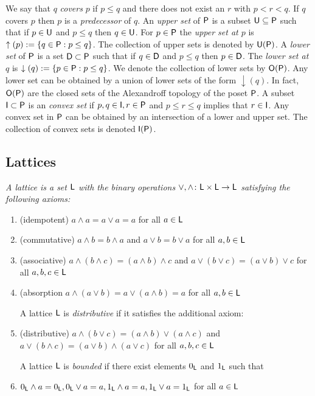 We say that $q$ {\em covers} $p$ if $p\leq q$ and there does not exist an $r$ with $p< r < q$.  
If $q$ covers $p$ then $p$ is a {\em predecessor} of $q$.   An {\em upper set} of ${\mathsf P}$ is a subset ${\mathsf U}\subseteq {\mathsf P}$ such that if $p\in {\mathsf U}$ and $p\leq q$ then $q\in {\mathsf U}$.  For $p\in {\mathsf P}$ the {\em upper set at $p$} is $\uparrow(p):=\{q\in {\mathsf P}:p \leq q\}$.  The collection of upper sets is denoted by ${\mathsf U}({\mathsf P})$.
A {\em lower set} of ${\mathsf P}$ is a set ${\mathsf D}\subset {\mathsf P}$ such that if $q\in {\mathsf D}$ and $p\leq q$ then $p\in {\mathsf D}$.  The {\em lower set at $q$} is $\downarrow(q):=\{p\in {\mathsf P}: p \leq q\}$.  We denote the collection of lower sets by ${\mathsf O}({\mathsf P})$.  Any lower set can be obtained by a union of lower sets of the form $\downarrow(q)$.  In fact, ${\mathsf O}({\mathsf P})$ are the closed sets of the Alexandroff topology of the poset ${\mathsf P}$.  A subset ${\mathsf I}\subset {\mathsf P}$ is an {\em convex set} if $p,q\in {\mathsf I}, r\in {\mathsf P}$ and $ p \leq r \leq q$ implies that $r\in {\mathsf I}$.  Any convex set in ${\mathsf P}$ can be obtained by an intersection of a lower and upper set.  The collection of convex sets is denoted ${\mathsf I}({\mathsf P})$.
 


\subsection{Lattices}

\begin{defn}
{\em
A {\em lattice} is a set ${\mathsf L}$ with the binary operations $\vee,\wedge \colon {\mathsf L}\times {\mathsf L}\to {\mathsf L}$ satisfying the following axioms:

\begin{enumerate}
\item (idempotent) $a\wedge a = a \vee a = a$ for all $a\in {\mathsf L}$
\item (commutative) $a\wedge b = b\wedge a$ and $a\vee b = b \vee a$ for all $a,b\in {\mathsf L}$
\item (associative) $a\wedge (b\wedge c) = (a\wedge b)\wedge c$ and $a\vee(b\vee c) = (a\vee b)\vee c$ for all $a,b,c\in {\mathsf L}$
\item (absorption $a\wedge (a\vee b) = a\vee (a\wedge b)=a$ for all $a,b\in {\mathsf L}$

A lattice ${\mathsf L}$ is {\em distributive} if it satisfies the additional axiom:

\item (distributive) $a\wedge (b\vee c) = (a\wedge b)\vee (a\wedge c)$ and $a\vee (b\wedge c) = (a\vee b) \wedge (a\vee c)$ for all $a,b,c\in {\mathsf L}$

A lattice ${\mathsf L}$ is {\em bounded} if there exist elements $0_{\mathsf L}$ and $1_{\mathsf L}$ such that

\item $0_{\mathsf L}\wedge a = 0_{\mathsf L}, 0_{\mathsf L}\vee a = a, 1_{\mathsf L}\wedge a = a, 1_{\mathsf L}\vee a = 1_{\mathsf L}$ for all $a\in {\mathsf L}$
\end{enumerate}
}
\end{defn}

